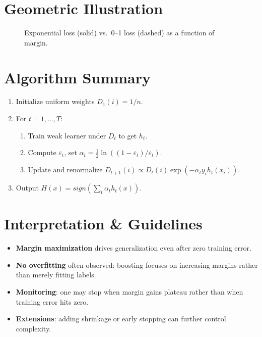 \documentclass[11pt]{article}
\begin{document}
\section{Geometric Illustration}
\begin{figure}[h]
\centering
{}
\caption{Exponential loss (solid) vs.\ 0--1 loss (dashed) as a function of margin.}
\end{figure}

\section{Algorithm Summary}
\begin{enumerate}
  \item Initialize uniform weights $D_1(i)=1/n$.
  \item For $t=1,\dots,T$:
    \begin{enumerate}
      \item Train weak learner under $D_t$ to get $h_t$.
      \item Compute $\varepsilon_t$, set $\alpha_t=\tfrac12\ln((1-\varepsilon_t)/\varepsilon_t)$.
      \item Update and renormalize $D_{t+1}(i)\propto D_t(i)\exp(-\alpha_t y_i h_t(x_i))$.
    \end{enumerate}
  \item Output $H(x)=sign(\sum_t\alpha_t h_t(x))$.
\end{enumerate}

\section{Interpretation \& Guidelines}
\begin{itemize}
  \item \textbf{Margin maximization} drives generalization even after zero training error.
  \item \textbf{No overfitting} often observed: boosting focuses on increasing margins rather than merely fitting labels.
  \item \textbf{Monitoring}: one may stop when margin gains plateau rather than when training error hits zero.
  \item \textbf{Extensions}: adding shrinkage or early stopping can further control complexity.
\end{itemize}
\end{document}
